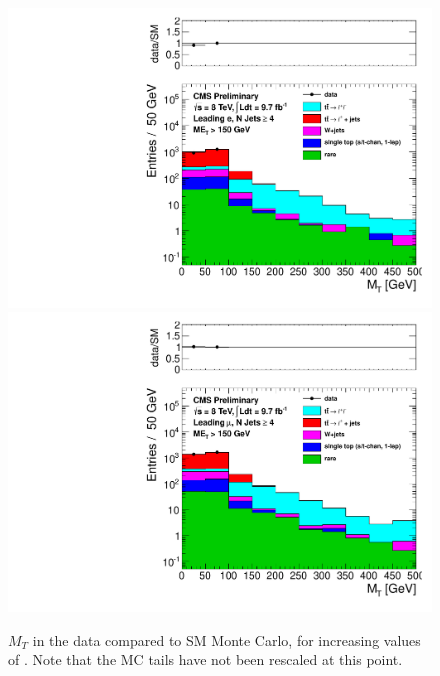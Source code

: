 \begin{figure}[hbt]
\begin{center}
        \includegraphics[width=0.5\linewidth]{plots/mt_met150_ele.pdf}%
        \includegraphics[width=0.5\linewidth]{plots/mt_met150_muo.pdf}

    \caption{$M_T$ in the data compared to SM Monte Carlo, for
      increasing values of \met. Note that the MC tails have not
      been rescaled at this point.
\label{fig:mtsig1}
}  
      \end{center}
\end{figure}

